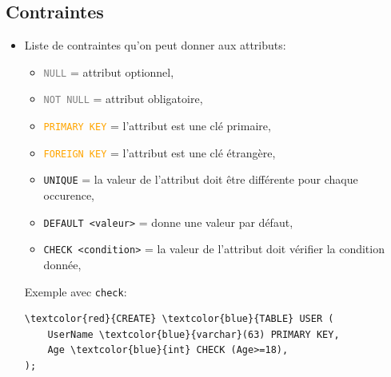 \documentclass[a4paper]{article}
\begin{document}
\subsection{Contraintes}





\begin{itemize}



\item Liste de contraintes qu'on peut donner aux attributs:
\begin{itemize}
    \item \texttt{\textcolor{gray}{NULL}} = attribut optionnel,
    \item \texttt{\textcolor{gray}{NOT NULL}} = attribut obligatoire,
    \item \texttt{\textcolor{orange}{PRIMARY KEY}} = l'attribut est une clé primaire,
    \item \texttt{\textcolor{orange}{FOREIGN KEY}} = l'attribut est une clé étrangère,
    \item \texttt{UNIQUE} = la valeur de l'attribut doit être différente pour chaque occurence,
    \item \texttt{DEFAULT <valeur>} = donne une valeur par défaut,
    \item \texttt{CHECK <condition>} = la valeur de l'attribut doit vérifier la condition donnée,
\end{itemize}
Exemple avec \texttt{check}:
\begin{Verbatim}[commandchars=\\\{\}]
\textcolor{red}{CREATE} \textcolor{blue}{TABLE} USER (
    UserName \textcolor{blue}{varchar}(63) PRIMARY KEY,
    Age \textcolor{blue}{int} CHECK (Age>=18),
);
\end{Verbatim}




\end{itemize}
\end{document}
